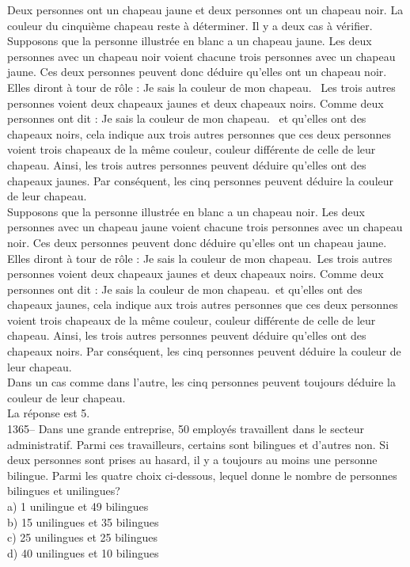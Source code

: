 ﻿\documentclass[letterpaper, 12pt]{article}
\begin{document}
Deux personnes ont un chapeau jaune et deux personnes ont un chapeau noir.
La couleur du cinqui\`eme
chapeau reste \`a d\'eterminer.  Il y a deux cas \`a v\'erifier.\\
Supposons que la personne illustr\'ee en blanc a un chapeau jaune.
Les deux personnes avec un chapeau noir voient chacune trois
personnes avec un chapeau jaune.  Ces deux personnes peuvent donc
d\'eduire qu'elles ont un chapeau noir.  Elles diront \`a tour de
r\^ole : \og Je sais la couleur de mon chapeau. \fg\ Les trois
autres personnes voient deux chapeaux jaunes et deux chapeaux noirs.
Comme deux personnes ont dit : \og Je sais la couleur de mon
chapeau. \fg\ et qu'elles ont des chapeaux noirs, cela indique aux
trois autres personnes que ces deux personnes voient trois chapeaux
de la m\^eme couleur, couleur diff\'erente de celle de leur chapeau.
Ainsi, les trois autres personnes peuvent d\'eduire qu'elles ont des
chapeaux jaunes. Par cons\'equent, les cinq personnes peuvent
d\'eduire la couleur de leur
chapeau.\\

Supposons que la personne illustr\'ee en blanc a un chapeau noir.
Les deux personnes avec un chapeau jaune voient chacune trois
personnes avec un chapeau noir.  Ces deux personnes peuvent donc
d\'eduire qu'elles ont un chapeau jaune.  Elles diront \`a tour de
r\^ole : \og Je sais la couleur de mon chapeau.\fg\ Les trois autres
personnes voient deux chapeaux jaunes et deux chapeaux noirs.  Comme
deux personnes ont dit : \og Je sais la couleur de mon chapeau.\fg\
et qu'elles ont des chapeaux jaunes, cela indique aux trois autres
personnes que ces deux personnes voient trois chapeaux de la m\^eme
couleur, couleur diff\'erente de celle de leur chapeau. Ainsi, les
trois autres personnes peuvent d\'eduire qu'elles ont des chapeaux
noirs.  Par cons\'equent, les cinq personnes peuvent d\'eduire la
couleur de
leur chapeau.\\

Dans un cas comme dans l'autre, les cinq personnes peuvent toujours
d\'eduire la couleur de leur chapeau.\\

La r\'eponse est 5.\\

1365-- Dans une grande entreprise, 50 employ\'es travaillent dans le secteur
administratif.  Parmi ces travailleurs, certains sont bilingues et d'autres
non.  Si deux personnes sont prises au hasard, il y a toujours au moins une
personne bilingue.  Parmi les quatre choix ci-dessous, lequel donne le
nombre de personnes bilingues et unilingues?\\
a) 1 unilingue et 49 bilingues\\
b) 15 unilingues et 35 bilingues\\
c) 25 unilingues et 25 bilingues\\
d) 40 unilingues et 10 bilingues\\
\end{document}
